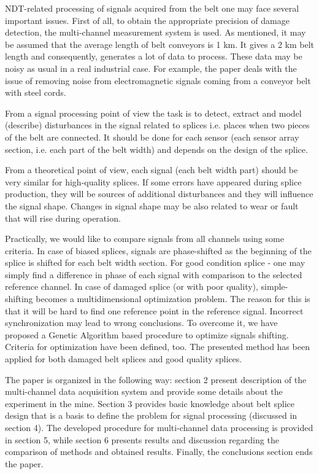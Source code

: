 \documentclass[applsci,article,preprint,moreauthors,pdftex]{Definitions/mdpi}
\begin{document}
NDT-related processing of signals acquired from the belt one may face several important issues. First of all, to obtain the appropriate precision of damage detection, the multi-channel measurement system is used. As mentioned, it may be assumed that the average length of belt conveyors is 1 km. It gives a 2 km belt length and consequently, generates a lot of data to process. These data may be noisy as usual in a real industrial case. For example, the paper \cite{ma2016noise} deals with the issue of removing noise from electromagnetic signals coming from a conveyor belt with steel cords. 

From a signal processing point of view the task is to detect, extract and model (describe) disturbances in the signal related to splices i.e. places when two pieces of the belt are connected. It should be done for each sensor (each sensor array section, i.e. each part of the belt width) and depends on the design of the splice.

From a theoretical point of view, each signal (each belt width part) should be very similar for high-quality splices. If some errors have appeared during splice production, they will be sources of additional disturbances and they will influence the signal shape. Changes in signal shape may be also related to wear or fault that will rise during operation.

Practically, we would like to compare signals from all channels using some criteria. In case of biased splices, signals are phase-shifted as the beginning of the splice is shifted for each belt width section. For good condition splice - one may simply find a difference in phase of each signal with comparison to the selected reference channel. In case of damaged splice (or with poor quality), simple-shifting becomes a multidimensional optimization problem. The reason for this is that it will be hard to find one reference point in the reference signal. Incorrect synchronization may lead to wrong conclusions. To overcome it, we have proposed a Genetic Algorithm based procedure to optimize signals shifting. Criteria for optimization have been defined, too. The presented method has been applied for both damaged belt splices and good quality splices.

The paper is organized in the following way: section 2 present description of the multi-channel data acquisition system and provide some details about the experiment in the mine. Section 3 provides basic knowledge about belt splice design that is a basis to define the problem for signal processing (discussed in section 4). The developed procedure for multi-channel data processing is provided in section 5, while section 6 presents results and discussion regarding the comparison of methods and obtained results. Finally, the conclusions section ends the paper.
\end{document}
